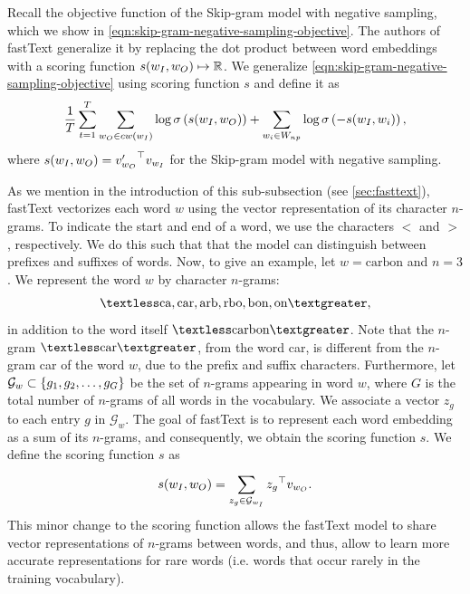 Recall the objective function of the Skip-gram model with negative sampling, which we show in \cref{eqn:skip-gram-negative-sampling-objective}. The authors of fastText generalize it by replacing the dot product between word embeddings with a scoring function $s(w_I, w_O) \mapsto \mathbb{R}$. We generalize \cref{eqn:skip-gram-negative-sampling-objective} using scoring function $s$ and define it as
\begin{align}
    \frac{1}{T} \sum\limits_{t=1}^{T} \sum\limits_{w_O \in cw(w_I)}^{} \log \sigma \left( s(w_I, w_O) \right) + \sum\limits_{w_i \in W_{np}}^{} \log \sigma \left( -s(w_I, w_i) \right),
    \label{eqn:skip-gram-negative-sampling-objective-general}
\end{align}
where $s(w_I, w_O)={v'_{w_O}}^\top v_{w_I}$ for the Skip-gram model with negative sampling.

As we mention in the introduction of this sub-subsection (see \cref{sec:fasttext}), fastText vectorizes each word $w$ using the vector representation of its character $n$-grams. To indicate the start and end of a word, we use the characters $<$ and $>$, respectively. We do this such that that the model can distinguish between prefixes and suffixes of words. Now, to give an example, let $w=\text{carbon}$ and $n=3$. We represent the word $w$ by character $n$-grams:
\begin{align*}
    \textless\text{ca}, \text{car}, \text{arb}, \text{rbo}, \text{bon}, \text{on}\textgreater,
\end{align*}
in addition to the word itself $\textless\text{carbon}\textgreater$. Note that the $n$-gram $\textless\text{car}\textgreater$, from the word car, is different from the $n$-gram car of the word $w$, due to the prefix and suffix characters. Furthermore, let $\mathcal{G}_w \subset \left\{g_1, g_2, \ldots, g_G\right\}$ be the set of $n$-grams appearing in word $w$, where $G$ is the total number of $n$-grams of all words in the vocabulary. We associate a vector $z_g$ to each entry $g$ in $\mathcal{G}_w$. The goal of fastText is to represent each word embedding as a sum of its $n$-grams, and consequently, we obtain the scoring function $s$. We define the scoring function $s$ as
\begin{align}
    s(w_I, w_O) = \sum\limits_{z_g \in \mathcal{G}_{w_I}}^{} {z_g}^\top v_{w_O}.
    \label{eqn:fasttext-scoring-function}
\end{align}
This minor change to the scoring function allows the fastText model to share vector representations of $n$-grams between words, and thus, allow to learn more accurate representations for rare words (i.e. words that occur rarely in the training vocabulary).

